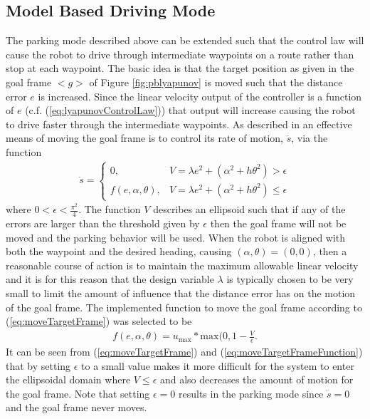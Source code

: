 \subsection{Model Based Driving Mode}
\label{sec:drivingMode}
The parking mode described above can be extended such that the control law will cause the robot to drive through intermediate waypoints on a route rather than stop at each waypoint. The basic idea is that the target position as given in the goal frame $<g>$ of Figure \ref{fig:pblyapunov} is moved such that the distance error $e$ is increased. Since the linear velocity output of the controller is a function of $e$ (c.f. (\ref{eq:lyapunovControlLaw})) that output will increase causing the robot to drive faster through the intermediate waypoints. As described in \cite{Aicardi_UnicycleLyapunov95} an effective means of moving the goal frame is to control its rate of motion, $\dot{s}$, via the function
\begin{align}
\label{eq:moveTargetFrame}
\dot{s} =
\begin{cases}
0, & V = \lambda e^2 + (\alpha^2+h\theta^2) > \epsilon \\
f(e,\alpha,\theta), & V = \lambda e^2 + (\alpha^2+h\theta^2) \leq \epsilon
\end{cases}
\end{align}
where $0<\epsilon<\frac{\pi^2}{4}$. The function $V$ describes an ellipsoid such that if any of the errors are larger than the threshold given by $\epsilon$ then the goal frame will not be moved and the parking behavior will be used. When the robot is aligned with both the waypoint and the desired heading, causing $(\alpha,\theta)=(0,0)$, then a reasonable course of action is to maintain the maximum allowable linear velocity and it is for this reason that the design variable $\lambda$ is typically chosen to be very small to limit the amount of influence that the distance error has on the motion of the goal frame. The implemented function to move the goal frame according to (\ref{eq:moveTargetFrame}) was selected to be
\begin{align}
\label{eq:moveTargetFrameFunction}
f(e,\alpha,\theta) = u_{\text{max}} * \text{max}(0, 1 - \frac{V}{\epsilon}.
\end{align}
It can be seen from (\ref{eq:moveTargetFrame}) and (\ref{eq:moveTargetFrameFunction}) that by setting $\epsilon$ to a small value makes it more difficult for the system to enter the ellipsoidal domain where $V\leq\epsilon$ and also decreases the amount of motion for the goal frame. Note that setting $\epsilon=0$ results in the parking mode since $\dot{s}=0$ and the goal frame never moves.

